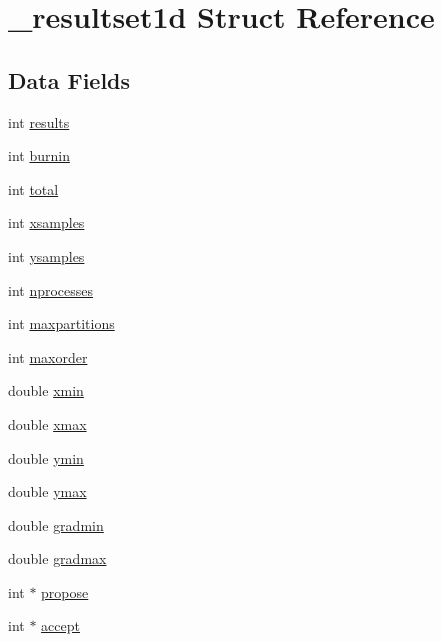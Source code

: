 \hypertarget{struct__resultset1d}{}\section{\+\_\+resultset1d Struct Reference}
\label{struct__resultset1d}
\subsection*{Data Fields}
\begin{DoxyCompactItemize}
\item 
int \hyperlink{struct__resultset1d_a410df825b9364f14da01022c7cb6c920}{results}
\item 
int \hyperlink{struct__resultset1d_a04dbefde6d377a2a0d0238a8b5bafee4}{burnin}
\item 
int \hyperlink{struct__resultset1d_a223c023b104e0d389437bf5f27373b93}{total}
\item 
int \hyperlink{struct__resultset1d_ad9d22c9f074c151990d84f79057b6a62}{xsamples}
\item 
int \hyperlink{struct__resultset1d_af3d587fe163f90f42a09181e797c2f68}{ysamples}
\item 
int \hyperlink{struct__resultset1d_ad283326b9422a787013d772dcdde7815}{nprocesses}
\item 
int \hyperlink{struct__resultset1d_ab02e20c072248bb32fd689a089263ea2}{maxpartitions}
\item 
int \hyperlink{struct__resultset1d_a30be3c7ae0f7a5e5d50794c35212c74a}{maxorder}
\item 
double \hyperlink{struct__resultset1d_abb880fc6318a6e920a24129a0f69713e}{xmin}
\item 
double \hyperlink{struct__resultset1d_aafe77a040d0426b81801841b28b97352}{xmax}
\item 
double \hyperlink{struct__resultset1d_a1aa9fced3e7f1101d20756e7958807ab}{ymin}
\item 
double \hyperlink{struct__resultset1d_a2826260840f94eb40d18cda2e6173de9}{ymax}
\item 
double \hyperlink{struct__resultset1d_a305c135905f447e82d184e1c4840ef60}{gradmin}
\item 
double \hyperlink{struct__resultset1d_a94862d567a8790cde35959c1aa6764e3}{gradmax}
\item 
int $\ast$ \hyperlink{struct__resultset1d_af58932e494062579242e74f66f82e449}{propose}
\item 
int $\ast$ \hyperlink{struct__resultset1d_acf68e2b4148ba3b2b1bf55f1a19ccb0d}{accept}

\end{DoxyCompactItemize}
